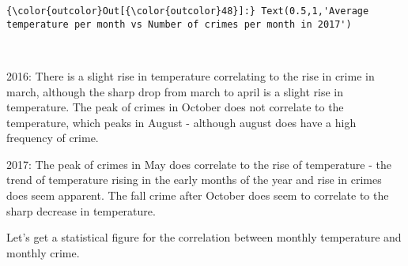 \documentclass[11pt]{article}
\begin{document}
\begin{Verbatim}[commandchars=\\\{\}]
{\color{outcolor}Out[{\color{outcolor}48}]:} Text(0.5,1,'Average temperature per month vs Number of crimes per month in 2017')
\end{Verbatim}
            
    \begin{center}
    \end{center}
    { \hspace*{\fill} \\}
    
     2016: There is a slight rise in temperature correlating to the rise in
crime in march, although the sharp drop from march to april is a slight
rise in temperature. The peak of crimes in October does not correlate to
the temperature, which peaks in August - although august does have a
high frequency of crime.

2017: The peak of crimes in May does correlate to the rise of
temperature - the trend of temperature rising in the early months of the
year and rise in crimes does seem apparent. The fall crime after October
does seem to correlate to the sharp decrease in temperature.

Let's get a statistical figure for the correlation between monthly
temperature and monthly crime. 
\end{document}
